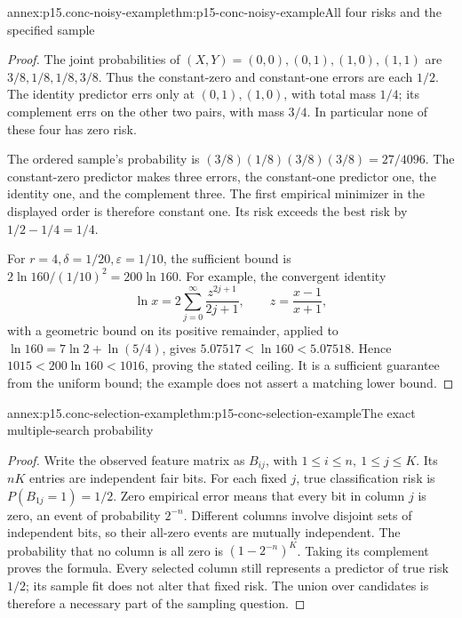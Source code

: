 \begin{annexitem}{annex:p15.conc-noisy-example}{thm:p15-conc-noisy-example}{All four risks and the specified sample}
\begin{proof}
The joint probabilities of \((X,Y)=(0,0),(0,1),(1,0),(1,1)\)
are \(3/8,1/8,1/8,3/8\). Thus the constant-zero and
constant-one errors are each \(1/2\).
The identity predictor errs only at \((0,1),(1,0)\),
with total mass \(1/4\); its complement errs on the
other two pairs, with mass \(3/4\).
In particular none of these four has zero risk.

The ordered sample's probability is
\((3/8)(1/8)(3/8)(3/8)=27/4096\).
The constant-zero predictor makes three errors,
the constant-one predictor one, the identity one,
and the complement three. The first empirical
minimizer in the displayed order is therefore
constant one. Its risk exceeds the best risk
by \(1/2-1/4=1/4\).

For \(r=4,\delta=1/20,\varepsilon=1/10\), the
sufficient bound is \(2\ln160/(1/10)^2=200\ln160\).
For example, the convergent identity
\[
 \ln x=2\sum_{j=0}^{\infty}
       \frac{z^{2j+1}}{2j+1},\qquad z=\frac{x-1}{x+1},
\]
with a geometric bound on its positive remainder,
applied to \(\ln160=7\ln2+\ln(5/4)\), gives
\(5.07517<\ln160<5.07518\).
Hence \(1015<200\ln160<1016\), proving the stated ceiling.
It is a sufficient guarantee from the uniform bound;
the example does not assert a matching lower bound.
\end{proof}
\end{annexitem}

\begin{annexitem}{annex:p15.conc-selection-example}{thm:p15-conc-selection-example}{The exact multiple-search probability}
\begin{proof}
Write the observed feature matrix as \(B_{ij}\),
with \(1\leq i\leq n,\ 1\leq j\leq K\).
Its \(nK\) entries are independent fair bits.
For each fixed \(j\), true classification risk is
\(P(B_{1j}=1)=1/2\). Zero empirical error means
that every bit in column \(j\) is zero, an event
of probability \(2^{-n}\).
Different columns involve disjoint sets of independent
bits, so their all-zero events are mutually independent.
The probability that no column is all zero is
\((1-2^{-n})^K\). Taking its complement proves the formula.
Every selected column still represents a predictor
of true risk \(1/2\); its sample fit does not alter
that fixed risk. The union over candidates is
therefore a necessary part of the sampling question.
\end{proof}
\end{annexitem}

